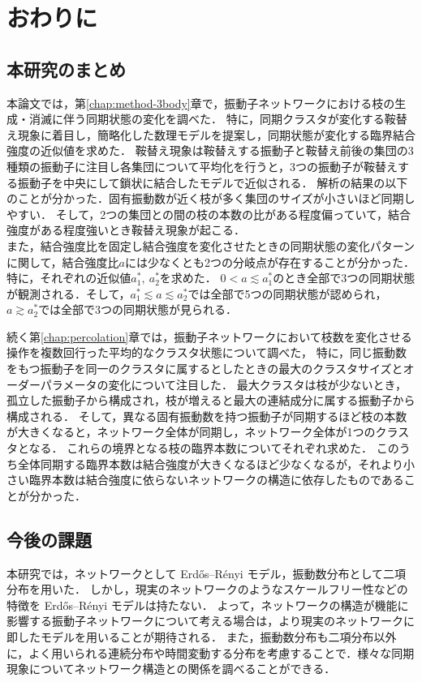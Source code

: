 \documentclass[../main]{subfiles}
\begin{document}
\chapter{おわりに}
\label{chap:summary}
\section{本研究のまとめ}
本論文では，第\ref{chap:method-3body}章で，振動子ネットワークにおける枝の生成・消滅に伴う同期状態の変化を調べた．
特に，同期クラスタが変化する鞍替え現象に着目し，簡略化した数理モデルを提案し，同期状態が変化する臨界結合強度の近似値を求めた．
鞍替え現象は鞍替えする振動子と鞍替え前後の集団の3種類の振動子に注目し各集団について平均化を行うと，3つの振動子が鞍替えする振動子を中央にして鎖状に結合したモデルで近似される．
解析の結果の以下のことが分かった．固有振動数が近く枝が多く集団のサイズが小さいほど同期しやすい．
そして，2つの集団との間の枝の本数の比がある程度偏っていて，結合強度がある程度強いとき鞍替え現象が起こる．\\
また，結合強度比を固定し結合強度を変化させたときの同期状態の変化パターンに関して，結合強度比$a$には少なくとも2つの分岐点が存在することが分かった．特に，それぞれの近似値$a^\ast_1,\ a^\ast_2$を求めた．
$0<a\lesssim a^\ast_1$のとき全部で3つの同期状態が観測される．そして，$a^\ast_1\lesssim a\lesssim a^\ast_2$では全部で5つの同期状態が認められ，$a\gtrsim a^\ast_2$では全部で3つの同期状態が見られる．

続く第\ref{chap:percolation}章では，振動子ネットワークにおいて枝数を変化させる操作を複数回行った平均的なクラスタ状態について調べた，
特に，同じ振動数をもつ振動子を同一のクラスタに属するとしたときの最大のクラスタサイズとオーダーパラメータの変化について注目した．
最大クラスタは枝が少ないとき，孤立した振動子から構成され，枝が増えると最大の連結成分に属する振動子から構成される．
そして，異なる固有振動数を持つ振動子が同期するほど枝の本数が大きくなると，ネットワーク全体が同期し，ネットワーク全体が1つのクラスタとなる．
これらの境界となる枝の臨界本数についてそれぞれ求めた．
このうち全体同期する臨界本数は結合強度が大きくなるほど少なくなるが，それより小さい臨界本数は結合強度に依らないネットワークの構造に依存したものであることが分かった．
\section{今後の課題}
本研究では，ネットワークとして Erd\H{o}s–R\'{e}nyi モデル，振動数分布として二項分布を用いた．
しかし，現実のネットワークのようなスケールフリー性などの特徴を Erd\H{o}s–R\'{e}nyi モデルは持たない．
よって，ネットワークの構造が機能に影響する振動子ネットワークについて考える場合は，より現実のネットワークに即したモデル\cite{Moreno_2004}を用いることが期待される．
また，振動数分布も二項分布以外に，よく用いられる連続分布\cite{RevModPhys.77.137}や時間変動する分布\cite{CUMIN2007181}を考慮することで．様々な同期現象についてネットワーク構造との関係を調べることができる．
\end{document}
